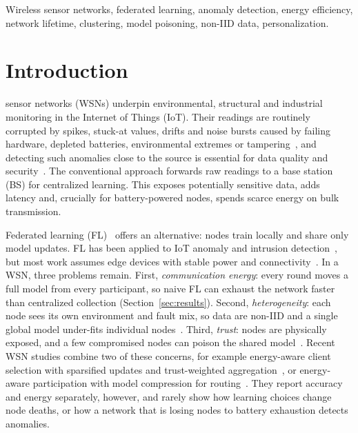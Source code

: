 \documentclass[journal]{IEEEtran}
\begin{document}
\begin{IEEEkeywords}
Wireless sensor networks, federated learning, anomaly detection, energy efficiency, network lifetime, clustering, model poisoning, non-IID data, personalization.
\end{IEEEkeywords}

\section{Introduction}
 sensor networks (WSNs) underpin environmental, structural and industrial monitoring in the Internet of Things (IoT). Their readings are routinely corrupted by spikes, stuck-at values, drifts and noise bursts caused by failing hardware, depleted batteries, environmental extremes or tampering~\cite{ni2009,sharma2010}, and detecting such anomalies close to the source is essential for data quality and security~\cite{rajasegarar2008}. The conventional approach forwards raw readings to a base station (BS) for centralized learning. This exposes potentially sensitive data, adds latency and, crucially for battery-powered nodes, spends scarce energy on bulk transmission.

Federated learning (FL)~\cite{mcmahan2017,kairouz2021} offers an alternative: nodes train locally and share only model updates. FL has been applied to IoT anomaly and intrusion detection~\cite{nguyen2019diot,mothukuri2022}, but most work assumes edge devices with stable power and connectivity~\cite{lim2020}. In a WSN, three problems remain. First, \emph{communication energy}: every round moves a full model from every participant, so naive FL can exhaust the network faster than centralized collection (Section~\ref{sec:results}). Second, \emph{heterogeneity}: each node sees its own environment and fault mix, so data are non-IID and a single global model under-fits individual nodes~\cite{zhao2018,hsu2019}. Third, \emph{trust}: nodes are physically exposed, and a few compromised nodes can poison the shared model~\cite{blanchard2017,fang2020,uddin2025}. Recent WSN studies combine two of these concerns, for example energy-aware client selection with sparsified updates and trust-weighted aggregation~\cite{bhagyalakshmi2026}, or energy-aware participation with model compression for routing~\cite{hawkinson2025}. They report accuracy and energy separately, however, and rarely show how learning choices change node deaths, or how a network that is losing nodes to battery exhaustion detects anomalies.
\end{document}
